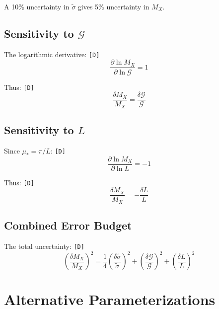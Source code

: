 \documentclass[11pt,a4paper]{article}
\newcommand{\tagD}{\textcolor{green!50!black}{\texttt{[D]}}}
\theoremstyle{definition}
\begin{document}
A 10\% uncertainty in $\tilde{\sigma}$ gives 5\% uncertainty in $M_X$.

\subsection{Sensitivity to $\mathcal{G}$}
\label{app:g-sensitivity}

The logarithmic derivative: \tagD{}
\begin{equation}
\label{eq:log-derivative-g}
\frac{\partial \ln M_X}{\partial \ln \mathcal{G}} = 1
\end{equation}

Thus: \tagD{}
\begin{equation}
\label{eq:g-sensitivity}
\frac{\delta M_X}{M_X} = \frac{\delta \mathcal{G}}{\mathcal{G}}
\end{equation}

\subsection{Sensitivity to $L$}
\label{app:l-sensitivity}

Since $\mu_* = \pi/L$: \tagD{}
\begin{equation}
\label{eq:log-derivative-l}
\frac{\partial \ln M_X}{\partial \ln L} = -1
\end{equation}

Thus: \tagD{}
\begin{equation}
\label{eq:l-sensitivity}
\frac{\delta M_X}{M_X} = -\frac{\delta L}{L}
\end{equation}

\subsection{Combined Error Budget}
\label{app:error-budget}

The total uncertainty: \tagD{}
\begin{equation}
\label{eq:total-uncertainty}
\left(\frac{\delta M_X}{M_X}\right)^2 = \frac{1}{4}\left(\frac{\delta \tilde{\sigma}}{\tilde{\sigma}}\right)^2 + \left(\frac{\delta \mathcal{G}}{\mathcal{G}}\right)^2 + \left(\frac{\delta L}{L}\right)^2
\end{equation}

\section{Alternative Parameterizations}
\label{app:alternative}
\end{document}
